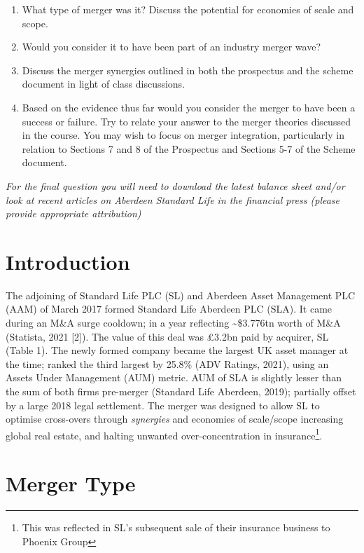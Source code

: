 \documentclass[11pt, english]{article}
\begin{document}
	\begin{enumerate}
		\item What type of merger was it? Discuss the potential for economies of scale and scope.
		\item Would you consider it to have been part of an industry merger wave?
		\item Discuss the merger synergies outlined in both the prospectus and the scheme                     
document in light of class discussions.
\item Based on the evidence thus far would you consider the merger to have been a success or failure. Try to relate your answer to the merger theories discussed in the course. You may wish to focus on merger integration, particularly in relation to Sections 7 and 8 of the Prospectus and Sections 5-7 of the Scheme document.
	\end{enumerate}

	\textit{For the final question you will need to download the latest balance sheet and/or look at recent articles on Aberdeen Standard Life in the financial press (please provide appropriate attribution)}

\newpage


\section{Introduction}

The adjoining of Standard Life PLC (SL) and Aberdeen Asset Management PLC (AAM) of March 2017 formed Standard Life Aberdeen PLC (SLA). It came during an M\&A surge cooldown; in a year reflecting \~{}\$3.776tn worth of M\&A (Statista, 2021 [2]). The value of this deal was \pounds3.2bn paid by acquirer, SL (Table 1). The newly formed company became the largest UK asset manager at the time; ranked the third largest by 25.8\% (ADV Ratings, 2021), using an Assets Under Management (AUM) metric. AUM of SLA is slightly lesser than the sum of both firms pre-merger (Standard Life Aberdeen, 2019); partially offset by a large 2018 legal settlement. The merger was designed to allow SL to optimise cross-overs through \textit{synergies} and {economies of scale/scope} increasing global real estate, and halting unwanted over-concentration in insurance\footnote{This was reflected in SL's subsequent sale of their insurance business to Phoenix Group}.

\newpage

\section{Merger Type}
\end{document}

